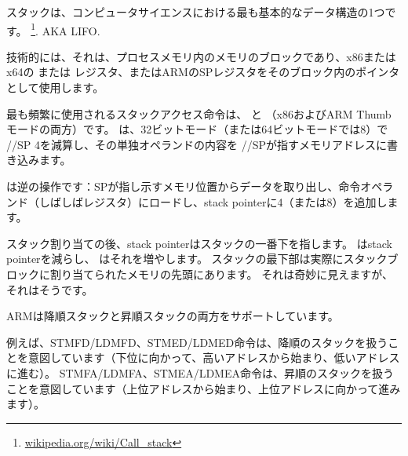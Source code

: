 \mysection{\Stack}
\label{sec:stack}
\myindex{\Stack}

スタックは、コンピュータサイエンスにおける最も基本的なデータ構造の1つです。
\footnote{\href{http://en.wikipedia.org/wiki/Call_stack}{wikipedia.org/wiki/Call\_stack}}.
\ac{AKA} \ac{LIFO}.

技術的には、それは、プロセスメモリ内のメモリのブロックであり、x86またはx64の \ESP または \RSP レジスタ、またはARMの\ac{SP}レジスタをそのブロック内のポインタとして使用します。

最も頻繁に使用されるスタックアクセス命令は、 \PUSH と \POP （x86およびARM Thumbモードの両方）です。 
\PUSH は、32ビットモード（または64ビットモードでは8）で \ESP/\RSP/\ac{SP} 4を減算し、その単独オペランドの内容を \ESP/\RSP/\ac{SP}が指すメモリアドレスに書き込みます。

\POP は逆の操作です：\ac{SP}が指し示すメモリ位置からデータを取り出し、命令オペランド（しばしばレジスタ）にロードし、\gls{stack pointer}に4（または8）を追加します。

スタック割り当ての後、\gls{stack pointer}はスタックの一番下を指します。 \PUSH は\gls{stack pointer}を減らし、 \POP はそれを増やします。 
スタックの最下部は実際にスタックブロックに割り当てられたメモリの先頭にあります。 それは奇妙に見えますが、それはそうです。

ARMは降順スタックと昇順スタックの両方をサポートしています。


例えば、\ac{STMFD}/\ac{LDMFD}、\ac{STMED}/\ac{LDMED}命令は、降順のスタックを扱うことを意図しています（下位に向かって、高いアドレスから始まり、低いアドレスに進む）。 \ac{STMFA}/\ac{LDMFA}、\ac{STMEA}/\ac{LDMEA}命令は、昇順のスタックを扱うことを意図しています（上位アドレスから始まり、上位アドレスに向かって進みます）。


